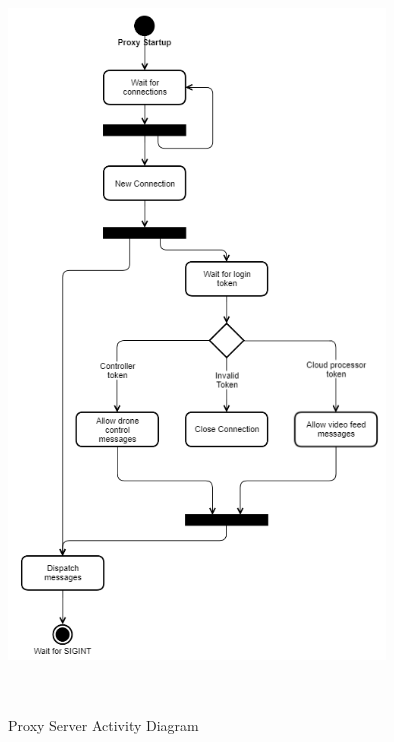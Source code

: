 \begin{figure}[ht]
    \label{fig:proxy-activity-diagram}
    \includegraphics[width=10cm, height=20cm,keepaspectratio]{img/proxy-activity.PNG}
    \caption{Proxy Server Activity Diagram}
\end{figure}

